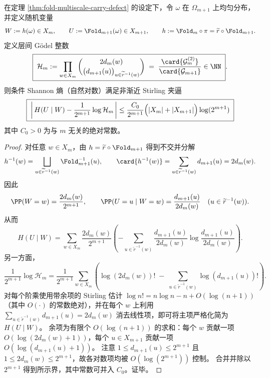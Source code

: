 \begin{theorem}\label{thm:fold-godel-carry-conditional-entropy}
在定理 \ref{thm:fold-multiscale-carry-defect} 的设定下，令 \(\omega\) 在 \(\Omega_{m+1}\) 上均匀分布，并定义随机变量
\[
W:=h(\omega)\in X_m,
\qquad
U:=\Fold_{m+1}(\omega)\in X_{m+1},
\qquad
h:=\Fold_m\circ\pi=\widetilde r\circ\Fold_{m+1}.
\]
定义层间 Gödel 整数
\[
\boxed{\;
\mathcal H_m
:=
\prod_{w\in X_m}
\binom{2d_m(w)}{\bigl(d_{m+1}(u)\bigr)_{u\in\widetilde r^{-1}(w)}}
\;=\;
\frac{\card{\mathcal{G}_m^{(2)}}}{\card{\mathcal{G}_{m+1}}}
\in\NN\; }.
\]
则条件 Shannon 熵（自然对数）满足非渐近 Stirling 夹逼
\[
\boxed{\;
\left|\,H(U\mid W)-\frac{1}{2^{m+1}}\log\mathcal H_m\,\right|
\le
\frac{C_0}{2^{m+1}}\Bigl(|X_m|+|X_{m+1}|\Bigr)\log(2^{m+1})
\;}
\]
其中 \(C_0>0\) 为与 \(m\) 无关的绝对常数。
\end{theorem}
\begin{proof}
对任意 \(w\in X_m\)，由 \(h=\widetilde r\circ \Fold_{m+1}\) 得到不交并分解
\[
h^{-1}(w)=\bigsqcup_{u\in\widetilde r^{-1}(w)}\Fold_{m+1}^{-1}(u),
\qquad
\card{h^{-1}(w)}=\sum_{u\in\widetilde r^{-1}(w)} d_{m+1}(u)=2d_m(w).
\]
因此
\[
\PP(W=w)=\frac{2d_m(w)}{2^{m+1}},
\qquad
\PP(U=u\mid W=w)=\frac{d_{m+1}(u)}{2d_m(w)}\quad(u\in\widetilde r^{-1}(w)).
\]
从而
\[
H(U\mid W)=
\sum_{w\in X_m}\frac{2d_m(w)}{2^{m+1}}
\left(
-\sum_{u\in\widetilde r^{-1}(w)}\frac{d_{m+1}(u)}{2d_m(w)}\log\frac{d_{m+1}(u)}{2d_m(w)}
\right).
\]
另一方面，
\[
\frac{1}{2^{m+1}}\log\mathcal H_m
=
\frac{1}{2^{m+1}}
\sum_{w\in X_m}
\left(
\log(2d_m(w))!
\;-\;
\sum_{u\in\widetilde r^{-1}(w)}\log(d_{m+1}(u))!
\right).
\]
对每个阶乘使用带余项的 Stirling 估计
\(
\log n!=n\log n-n+O(\log(n+1))
\)
（其中 \(O(\cdot)\) 的常数绝对），并在每个 \(w\) 上利用
\(
\sum_{u\in\widetilde r^{-1}(w)}d_{m+1}(u)=2d_m(w)
\)
消去线性项，即可将主项严格化简为 \(H(U\mid W)\)。
余项为有限个 \(O(\log(n+1))\) 的求和：每个 \(w\) 贡献一项 \(O(\log(2d_m(w)+1))\)，每个 \(u\in X_{m+1}\) 贡献一项 \(O(\log(d_{m+1}(u)+1))\)。
注意 \(1\le d_{m+1}(u)\le 2^{m+1}\) 且 \(1\le 2d_m(w)\le 2^{m+1}\)，故各对数项均被 \(O(\log(2^{m+1}))\) 控制。
合并并除以 \(2^{m+1}\) 得到所示界，其中常数可并入 \(C_0\)。证毕。
\end{proof}

